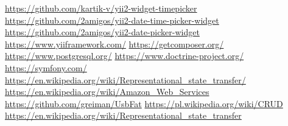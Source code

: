 \documentclass[declaration,shortabstract, mgr]{iithesis}
\begin{document}
\begin{thebibliography}{9}
		\url{https://github.com/kartik-v/yii2-widget-timepicker}	
		\url{https://github.com/2amigos/yii2-date-time-picker-widget}	
		\url{https://github.com/2amigos/yii2-date-picker-widget}	
		\url{https://www.yiiframework.com/}
		\url{https://getcomposer.org/}	
		\url{https://www.postgresql.org/}
		\url{https://www.doctrine-project.org/}
		\url{https://symfony.com/}	
		\url{https://en.wikipedia.org/wiki/Representational_state_transfer/}
		\url{https://en.wikipedia.org/wiki/Amazon_Web_Services}	
		\url{https://github.com/greiman/UsbFat}
		\url{https://pl.wikipedia.org/wiki/CRUD}	
		\url{https://en.wikipedia.org/wiki/Representational_state_transfer}	
		
		
		
\end{thebibliography}
\end{document}
